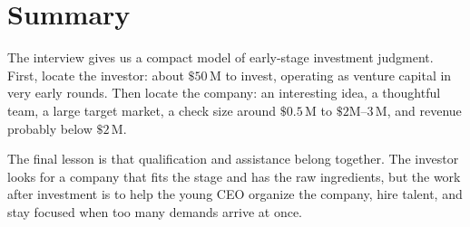 \section{Summary}

The interview gives us a compact model of early-stage investment judgment. First, locate the investor: about \( \$50\,\text{M} \) to invest, operating as venture capital in very early rounds. Then locate the company: an interesting idea, a thoughtful team, a large target market, a check size around \( \$0.5\,\text{M} \) to \( \$2\text{M--}3\,\text{M} \), and revenue probably below \( \$2\,\text{M} \).

The final lesson is that qualification and assistance belong together. The investor looks for a company that fits the stage and has the raw ingredients, but the work after investment is to help the young CEO organize the company, hire talent, and stay focused when too many demands arrive at once.